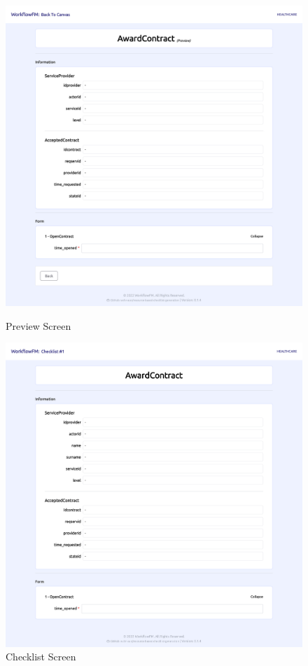 \begin{figure}[ht!]
\centering
\begin{minipage}{.5\textwidth}
  \centering
    \includegraphics[width=0.9\linewidth]{overleaf/images/screens/preview_screen.png}
    \caption{Preview Screen}
    \label{fig:preview_screen}
\end{minipage}%
\begin{minipage}{.5\textwidth}
  \centering
    \includegraphics[width=0.9\linewidth]{overleaf/images/screens/view_checklist_screen.png}
    \caption{Checklist Screen}
    \label{fig:view_checklist_screen}
\end{minipage}
\end{figure}


